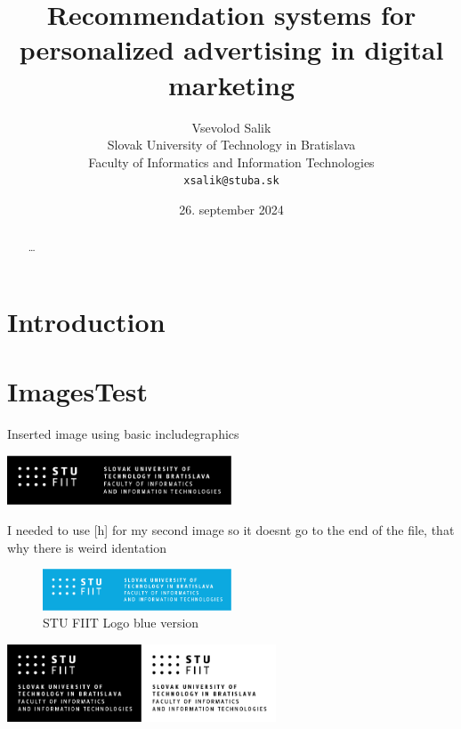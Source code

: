 \documentclass[10pt,twocolumn,twoside,english,a4paper]{article}
\title{Recommendation systems for personalized advertising in digital marketing} %
\author{Vsevolod Salik\\[2pt]
	{\small Slovak University of Technology in Bratislava }\\
	{\small Faculty of Informatics and Information Technologies }\\
	{\small \texttt{xsalik@stuba.sk}}
	}
\date{\small 26. september 2024} %
\begin{document}
\maketitle


\begin{abstract}
\ldots
\end{abstract}



\section{Introduction}


\section{ImagesTest}
\graphicspath{ {./images/PNG} }
Inserted image using basic includegraphics

\includegraphics[width=0.5\textwidth]{STU-FIIT-ancnh.png}

I needed to use [h] for my second image so it doesnt go to the end of the file, that why there is weird identation

\begin{figure}[h]
	\includegraphics[width=0.5\textwidth]{STU-FIIT-anfnh.png}
	\caption{STU FIIT Logo blue version}
	\label{logo_2}
\end{figure}

\hfil\includegraphics[width=0.3\textwidth]{STU-FIIT-ancnv.png}\hfil\includegraphics[width=0.3\textwidth]{STU-FIIT-ancv.png}
\end{document}
